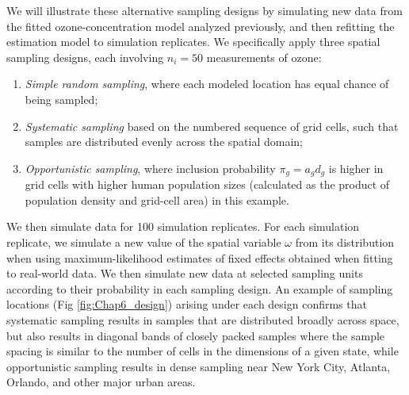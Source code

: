 We will illustrate these alternative sampling designs by simulating new data from the fitted ozone-concentration model analyzed previously, and then refitting the estimation model to simulation replicates.  We specifically apply three spatial sampling designs, each involving \(n_i=50\) measurements of ozone:
\begin{enumerate}
    \item \textit{Simple random sampling}, where each modeled location has equal chance of being sampled;

    \item \textit{Systematic sampling} based on the numbered sequence of grid cells, such that samples are distributed evenly across the spatial domain;

    \item \textit{Opportunistic sampling}, where inclusion probability \(\pi_g = a_g d_g\) is higher in grid cells with higher human population sizes (calculated as the product of population density and grid-cell area) in this example. 
\end{enumerate}
We then simulate data for 100 simulation replicates.  For each simulation replicate, we simulate a new value of the spatial variable \(\omega\) from its distribution when using maximum-likelihood estimates of fixed effects obtained when fitting to real-world data.  We then simulate new data at selected sampling units according to their probability in each sampling design.  An example of sampling locations (Fig \ref{fig:Chap6_design}) arising under each design confirms that systematic sampling results in samples that are distributed broadly across space, but also results in diagonal bands of closely packed samples where the sample spacing is similar to the number of cells in the dimensions of a given state, while opportunistic sampling results in dense sampling near New York City, Atlanta, Orlando, and other major urban areas.  

